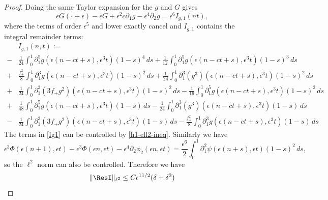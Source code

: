 \documentclass[oneside,reqno]{amsart}
\begin{document}
\begin{proof}
	Doing the same Taylor expansion for the \(g\) and \(G\) gives
	\begin{equation*}
			\epsilon G(\cdot + \epsilon) - \epsilon G + \epsilon^2c \partial_1 g - \epsilon^4 \partial_2 g  =  \epsilon^6 I_{g,1}(nt),
	\end{equation*}
	where the terms of order \(\epsilon^5\) and lower exactly cancel and \(I_{g,1}\) contains the integral remainder terms:
	\begin{equation}\label{Ig1}
		\begin{aligned}
			&I_{g,1}(n,t) := \\
			-&\frac{1} {24} \int_0^1 \partial_1^5 g(\epsilon(n - ct + s), \epsilon^3 t) (1-s)^4 \, ds +\frac{1} {12} \int_0^1 \partial_1^5 g(\epsilon(n - ct + s), \epsilon^3 t) (1-s)^3 \, ds \\
			+&\frac{ f_+^2} 8 \int_0^1 \partial_1^3 g(\epsilon(n - ct + s), \epsilon^3 t) (1-s)^2 \, ds +\frac{1} {24} \int_0^1 \partial_1^3(g^3)(\epsilon(n - ct + s), \epsilon^3 t) (1-s)^2 \, ds \\
			+&\frac{1} {24} \int_0^1 \partial_1^3(3f_+ g^2)(\epsilon(n - ct + s), \epsilon^3 t) (1-s)^2 \, ds - \frac{1} {16} \int_0^1 \partial_1^5g(\epsilon(n - ct + s), \epsilon^3 t) (1-s)^2 \, ds \\
			+ & \frac{1}{48}\int_0^1 \partial_1^5 g(\epsilon(n-ct+s), \epsilon^3 t)(1-s)\, ds -  \frac{1}{24} \int_0^1 \partial_1^3(g^3)(\epsilon(n-ct+s), \epsilon^3 t)(1-s)\, ds \\
			- & \frac{1}{24} \int_0^1 \partial_1^3(3f_+ g^2)(\epsilon(n-ct+s), \epsilon^3 t)(1-s)\, ds - \frac{f_+ ^2}{8} \int_0^1 \partial_1^3 g(\epsilon(n-ct+s), \epsilon^3 t) (1-s) \, ds
		\end{aligned}
	\end{equation}
	The terms in \cref{Ig1} can be controlled by \cref{h1-ell2-ineq}. Similarly we have
	\begin{equation*}
		\epsilon^3 \Phi(\epsilon(n+1), \epsilon t) - \epsilon^3\Phi(\epsilon n , \epsilon t) - \epsilon^4 \partial_2 \phi_2(\epsilon n, \epsilon t) =  \frac{\epsilon^6} 2 \int_0^1 \partial_1^2 \psi(\epsilon(n+s),\epsilon t)(1-s)^2\, ds,
	\end{equation*}
	so the \(\ell^2\) norm can also be controlled. Therefore we have 
	\begin{equation*}
		\| \ResI \|_{\ell^2} \leq C \epsilon^{11/2}(\delta + \delta^3)
	\end{equation*}
	

\end{proof}
\end{document}
